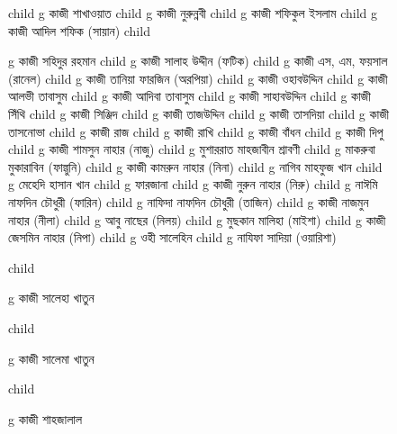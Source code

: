 \documentclass{article}
\begin{document}
\begin{figure}
{\begin{genealogypicture}
{{{{{        }%
        child{
          g{ কাজী শাখাওয়াত  }
              child{   g{ কাজী নুরুন্নবী }  }
              child{
                g{ কাজী শফিকুল ইসলাম } child{  g{ কাজী আদিল শফিক (সায়ান)  } } 
              }
        }%
        child{
          g{ কাজী সহিদুর রহমান}
 child{    g{ কাজী সালাহ উদ্দীন (ফটিক) } 
            child{    g{  কাজী এস, এম, ফয়সাল (রানেল) }   } %
            child{    g{ কাজী তানিয়া ফারজিন (অরপিয়া) }   }
      }
  child{    g{ কাজী ওহাবউদ্দিন  } 
      child{ g{ কাজী আলভী তাবাসুম }  }
      child{ g{ কাজী আদিবা তাবাসুম}  }
  }
 child{    g{ কাজী সাহাবউদ্দিন   } 
 child{    g{ কাজী সিঁথি }   }
  child{    g{ কাজী সিঞ্জিদ }   }
      }
  child{    g{ কাজী তাজউদ্দিন  } 
  child{ g{ কাজী তাসদিয়া }  }
 child{    g{ কাজী তাসনোভা }   }
  }
  child{    g{ কাজী রাজ } 
 child{    g{ কাজী রাখি  }   } %
 child{    g{ কাজী বাঁধন }   }
  }
  child{    g{ কাজী দিপু }   }
  child{    g{ কাজী শামসুন নাহার (নাজু)  } 
        child{ g{ মুশাররাত মাহজাবীন শ্রাবণী }  }
        child{ g{ মাকরুবা মুকারাবিন (ফাল্গুনি) }  }
  }
  child{    g{ কাজী কামরুন নাহার (নিনা) } 
      child{ g{  নাগিব মাহফুজ খান  }  }
      child{ g{  মেহেদি হাসান খান }  }
      child{ g{  ফারজানা }  }
    }
  child{    g{ কাজী নুরুন নাহার (নিরু) }  
          child{ g{ নাঈমি নাফদিন চৌধুরী (ফারিন) }  }
          child{ g{ নাফিদা নাফদিন চৌধুরী (তাজিন) }  }
   }
  child{    g{ কাজী নাজমুন নাহার (নীলা) }
        child{ g{ আবু নাছের (নিলয়) }  }
        child{ g{  মুছকান  মালিহা (মাইশা)}  }
     }
  child{    g{ কাজী জেসমিন নাহার (নিপা)  } 
        child{ g{ ওহী সালেহিন  }  }
        child{ g{ নাযিফা সাদিয়া (ওয়ারিশা) }  }
    }
 

        }%
        child{
          g{ কাজী সালেহা খাতুন }

        }%
        child{
          g{ কাজী সালেমা খাতুন }

        }%
        child{
          g{ কাজী শাহজালাল }

}}}}}
\end{genealogypicture}}
\end{figure}
\end{document}

